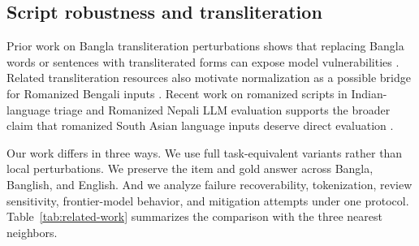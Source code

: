 \subsection{Script robustness and transliteration}

Prior work on Bangla transliteration perturbations shows that replacing Bangla words or sentences with transliterated forms can expose model vulnerabilities \cite{haider-etal-2025-robustness}. Related transliteration resources also motivate normalization as a possible bridge for Romanized Bengali inputs \cite{indotranslit2025}. Recent work on romanized scripts in Indian-language triage and Romanized Nepali LLM evaluation supports the broader claim that romanized South Asian language inputs deserve direct evaluation \cite{scriptgap2025,romanizednepali2026}.

Our work differs in three ways. We use full task-equivalent variants rather than local perturbations. We preserve the item and gold answer across Bangla, Banglish, and English. And we analyze failure recoverability, tokenization, review sensitivity, frontier-model behavior, and mitigation attempts under one protocol. Table~\ref{tab:related-work} summarizes the comparison with the three nearest neighbors.

\begin{table}[H]
\centering
\caption{Comparison with the nearest prior work on romanized South Asian script robustness. ``Partial'' marks design elements present in a weaker form (word/sentence-level perturbation rather than full task-equivalent variants; automatic rather than human-reviewed transliteration).}
\label{tab:related-work}
\small
{}
\end{table}

